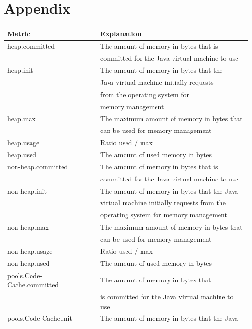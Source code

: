 \documentclass{seal_thesis}
\begin{document}
\backmatter



\chapter{Appendix}


\begin{table}[ht]
\centering
\begin{tabular}{|l|l|}
\hline
\textbf{Metric} & \textbf{Explanation} \\ \hline
heap.committed	& The amount of memory in bytes that is \\ 
				& committed for the Java virtual machine to use \\ \hline
heap.init 		& The amount of memory in bytes that the \\
				& Java virtual machine initially requests \\
				& from the operating system for \\
				& memory management \\ \hline
heap.max 		& The maximum amount of memory in bytes that \\
				& can be used for memory management \\ \hline
heap.usage & Ratio used / max \\ \hline
heap.used & The amount of used memory in bytes \\ \hline
non-heap.committed & The amount of memory in bytes that is \\
				& committed for the Java virtual machine to use \\ \hline
non-heap.init 	& The amount of memory in bytes that the Java \\
				& virtual machine initially requests from the \\
				& operating system for memory management \\ \hline
non-heap.max 	& The maximum amount of memory in bytes that \\
				& can be used for memory management \\ \hline
non-heap.usage 	& Ratio used / max \\ \hline
non-heap.used 	& The amount of used memory in bytes \\ \hline
pools.Code-Cache.committed 	& The amount of memory in bytes that \\
							& is committed for the Java virtual machine to use \\ \hline
pools.Code-Cache.init & The amount of memory in bytes that the Java \\

\end{tabular}
\end{table}
\end{document}
